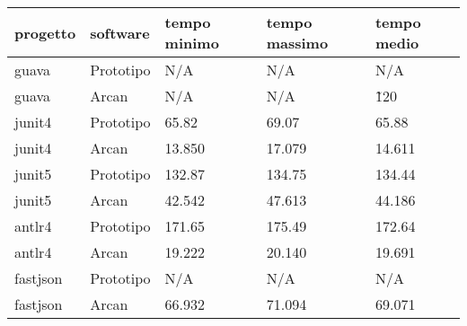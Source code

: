 \begin{center}
    \begin{tabular}{|l|l|l|l|l|}
        \hline
        progetto & software & tempo minimo & tempo massimo & tempo medio \\ \hline
        \hline
        \rowcolor[HTML]{FE0000}
        guava    & Prototipo & N/A    & N/A    & N/A    \\ \hline
        \rowcolor[HTML]{34FF34} 
        guava    & Arcan     & N/A    & N/A    & \~120   \\ \hline
        \rowcolor[HTML]{F27805} 
        junit4   & Prototipo & 65.82  & 69.07  & 65.88  \\ \hline
        \rowcolor[HTML]{34FF34} 
        junit4   & Arcan     & 13.850 & 17.079 & 14.611 \\ \hline
        \rowcolor[HTML]{F27805} 
        junit5   & Prototipo & 132.87 & 134.75 & 134.44 \\ \hline
        \rowcolor[HTML]{34FF34} 
        junit5   & Arcan     & 42.542 & 47.613 & 44.186 \\ \hline
        \rowcolor[HTML]{F27805} 
        antlr4   & Prototipo & 171.65 & 175.49 & 172.64 \\ \hline
        \rowcolor[HTML]{34FF34} 
        antlr4   & Arcan     & 19.222 & 20.140 & 19.691 \\ \hline
        \rowcolor[HTML]{FE0000} 
        fastjson & Prototipo & N/A    & N/A    & N/A    \\ \hline
        \rowcolor[HTML]{34FF34} 
        fastjson & Arcan     & 66.932 & 71.094 & 69.071 \\ \hline
    \end{tabular}
\end{center}
